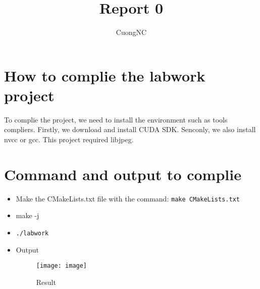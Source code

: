\documentclass[12pt]{article}
\begin{document}
 
 
\title{Report 0}
\author{CuongNC}
\maketitle
 
\section{How to complie the labwork project}

To complie the project, we need to install the environment such as tools compliers. Firstly, we download and install CUDA SDK. Senconly, we also install nvcc or gcc. This project required libjpeg.

\section{Command and output to complie}
\begin{itemize}
  \item Make the CMakeLists.txt file with the command: \texttt{make CMakeLists.txt}
  
  \item make -j
  \item \texttt{./labwork}
  \item Output 
  \begin{figure}[h]
\centering
\texttt{[image: image]}
\caption{\label{fig:conv}Result}
\end{figure}
\end{itemize}
\end{document}
